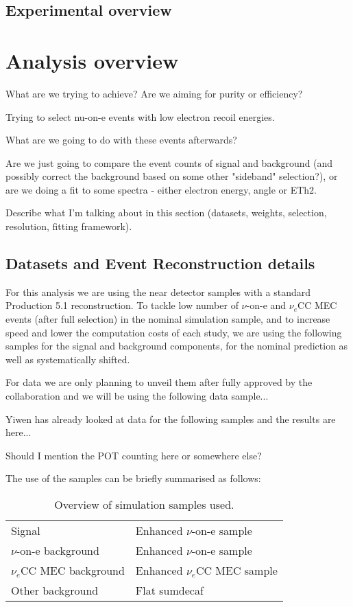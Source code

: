 \documentclass[12pt]{article}
\begin{document}
\subsection{Experimental overview}


\section{Analysis overview}
What are we trying to achieve? Are we aiming for purity or efficiency?

Trying to select nu-on-e events with low electron recoil energies.

What are we going to do with these events afterwards? 

Are we just going to compare the event counts of signal and background (and possibly correct the background based on some other "sideband" selection?), or are we doing a fit to some spectra - either electron energy, angle or ETh2.

Describe what I'm talking about in this section (datasets, weights, selection, resolution, fitting framework).

\subsection{Datasets and Event Reconstruction details}
For this analysis we are using the near detector samples with a standard Production 5.1 reconstruction. To tackle low number of $\nu$-on-e and $\nu_e$CC MEC events (after full selection) in the nominal simulation sample, and to increase speed and lower the computation costs of each study, we are using the following samples for the signal and background components, for the nominal prediction as well as systematically shifted.

For data we are only planning to unveil them after fully approved by the collaboration and we will be using the following data sample...

Yiwen has already looked at data for the following samples and the results are here...

Should I mention the POT counting here or somewhere else?

The use of the samples can be briefly summarised as follows:
\begin{table}[!ht]
\centering
\def\arraystretch{1.4}
\begin{tabular}{l@{\hskip 1in}l}
Signal                   & Enhanced $\nu$-on-e sample\\
$\nu$-on-e background    & Enhanced $\nu$-on-e sample\\
$\nu_e$CC MEC background & Enhanced $\nu_e$CC MEC sample\\
Other background         & Flat sumdecaf
\end{tabular}
\caption{Overview of simulation samples used.}
\label{tab:DefinitionsOverview}
\end{table}
\end{document}
